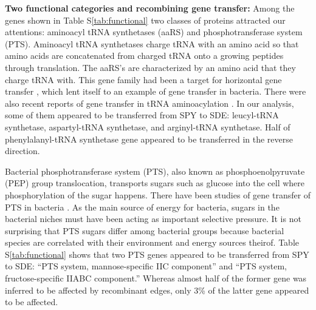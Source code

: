 \documentclass[english]{article}
\begin{document}
\textbf{Two functional categories and recombining gene transfer:}
Among the genes shown in Table S\ref{tab:functional} two classes of proteins
attracted our attentions: 
aminoacyl tRNA synthetases (aaRS) and phosphotransferase system (PTS).
Aminoacyl tRNA synthetases
charge tRNA with an amino acid so that amino acids are concatenated
from charged tRNA onto a growing peptides through translation. The
aaRS's are characterized by an amino acid that they charge tRNA with.
This gene family had been a target for horizontal gene transfer 
\citep[e.g.,][]{Lamour1994,Woese2000,Koonin2001},
which lent itself to an example of gene transfer in bacteria.
There were also recent reports of gene transfer in tRNA aminoacylation
\citep{Andam2010,Wang2011}. 
In our analysis, some of them appeared to be transferred
from SPY to SDE:
leucyl-tRNA synthetase, aspartyl-tRNA synthetase, and arginyl-tRNA
synthetase. Half of phenylalanyl-tRNA synthetase gene appeared to
be transferred in the reverse direction. 

Bacterial phosphotransferase
system (PTS), also known as phosphoenolpyruvate (PEP) group translocation,
transports sugars such as glucose into the cell where phosphorylation
of the sugar happens. There have been studies of gene transfer of
PTS in bacteria \citep[e.g.,][]{Barabote2005,Zuniga2005}. As the
main source of energy for bacteria, sugars in the bacterial niches
must have been acting as important selective pressure. It is not surprising
that PTS sugars differ among bacterial groups because bacterial species
are correlated with their environment and energy sources theirof.
Table S\ref{tab:functional} shows that 
two PTS genes appeared to be transferred from SPY to SDE:
{}``PTS system, mannose-specific IIC component'' and {}``PTS system,
fructose-specific IIABC component.'' Whereas almost half of the former
gene was inferred to be affected by recombinant edges, only 3\% of the latter gene appeared
to be affected. 
\end{document}
